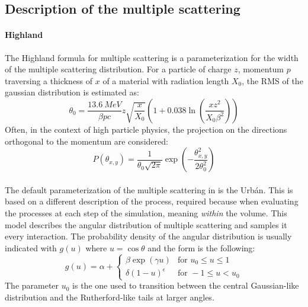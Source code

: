 \begin{refsection}
    \subsection{Description of the multiple scattering}
        \paragraph{Highland}
        The Highland formula for multiple scattering is a parameterization for the width of the multiple scattering distribution.
        For a particle of charge $z$, momentum $p$ traversing a thickness of $x$ of a material with radiation length $X_0$, the RMS of the gaussian distribution is estimated as:
        \begin{equation}
        \theta_0 = \frac{\SI{13.6}{MeV}}{\beta p c} z \sqrt{\frac{x}{X_0}} \left(1 + 0.038 \ln( \frac{x z^2}{X_0 \beta^2}) \right)
        \end{equation}
        Often, in the context of high particle physics, the projection on the directions orthogonal to the momentum are considered:
        \begin{equation}
        P(\theta_{x,y}) = \frac{1}{{\theta_0 \sqrt{2\pi}}} \exp\left(-\frac{\theta_{x,y}^2}{2\theta_0^2}\right)
        \end{equation}

        \paragraph{\gf}
        The default parameterization of the multiple scattering in \gf is the Urb\'{a}n. This is based on a different description of the process, required because when evaluating the processes at each step of the simulation, meaning \textit{within} the volume.
        This model describes the angular distribution of multiple scattering and samples it every interaction.
        The probability density of the angular distribution is usually indicated with $g(u)$ where $u = \cos \theta$ and the form is the following:
        \begin{equation}
            g(u) = \alpha +
            \begin{cases}
                \beta \exp(\gamma u) &\text{for } u_0 \le u \le 1 \\
                \delta (1-u)^\epsilon &\text{for } -1 \le u < u_0
            \end{cases}
        \end{equation}
        The parameter $u_0$ is the one used to transition between the central Gaussian-like distribution and the Rutherford-like tails at larger angles.\\


\end{refsection}
